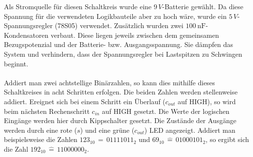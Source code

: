 Als Stromquelle für diesen Schaltkreis wurde eine $9\,V$-Batterie gewählt. Da diese Spannung für die verwendeten Logikbauteile aber zu hoch wäre, wurde ein $5\,V$-Spannungsregler (78S05) verwendet. Zusätzlich wurden zwei $\SI{100}{\nano\farad}$-Kondensatoren verbaut. Diese liegen jeweils zwischen dem gemeinsamen Bezugspotenzial und der Batterie- bzw. Ausgangsspannung. Sie dämpfen das System und verhindern, dass der Spannungsregler bei Lastspitzen zu Schwingen beginnt.\\\\
Addiert man zwei achtstellige Binärzahlen, so kann dies mithilfe dieses Schaltkreises in acht Schritten erfolgen. Die beiden Zahlen werden stellenweise addiert. Ereignet sich bei einem Schritt ein Überlauf ($c_{out}$ auf HIGH), so wird beim nächsten Rechenschritt $c_{in}$ auf HIGH gesetzt. Die Werte der logischen Eingänge werden hier durch Kippschalter gesetzt. Die Zustände der Ausgänge werden durch eine rote ($s$) und eine grüne ($c_{out}$) LED angezeigt. Addiert man beispielsweise die Zahlen $123_{10}\,\widehat{=}\,01111011_2$ und $69_{10}\,\widehat{=}\,01000101_2$, so ergibt sich die Zahl $192_{10}\,\widehat{=}\,11000000_2$.\\
\newpage
